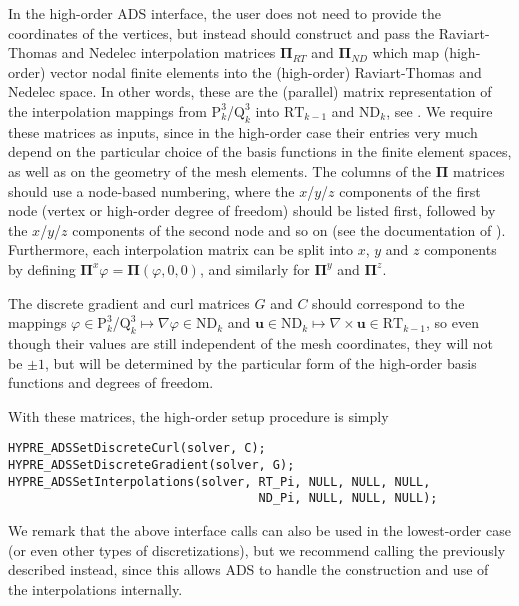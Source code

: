 In the high-order ADS interface, the user does not need to provide the
coordinates of the vertices, but instead should construct and pass the
Raviart-Thomas and Nedelec interpolation matrices ${\mathbf \Pi}_{RT}$ and
${\mathbf \Pi}_{ND}$ which map (high-order) vector nodal finite elements into
the (high-order) Raviart-Thomas and Nedelec space. In other words, these are the
(parallel) matrix representation of the interpolation mappings from
$\mathrm{P}_k^3$/$\mathrm{Q}_k^3$ into $\mathrm{RT}_{k-1}$ and $\mathrm{ND}_k$,
see \cite{xu_H_curl, ams_jcm}.  We require these matrices as inputs, since in
the high-order case their entries very much depend on the particular choice of
the basis functions in the finite element spaces, as well as on the geometry of
the mesh elements. The columns of the ${\mathbf \Pi}$ matrices should use a
node-based numbering, where the $x$/$y$/$z$ components of the first node (vertex
or high-order degree of freedom) should be listed first, followed by the
$x$/$y$/$z$ components of the second node and so on (see the documentation of
). Furthermore, each interpolation matrix can be
split into $x$, $y$ and $z$ components by defining ${\mathbf \Pi}^x \varphi =
{\mathbf \Pi} (\varphi,0,0)$, and similarly for ${\mathbf \Pi}^y$ and ${\mathbf
  \Pi}^z$.

The discrete gradient and curl matrices $G$ and $C$ should correspond to the
mappings $\varphi \in \mathrm{P}_k^3$/$\mathrm{Q}_k^3 \mapsto \nabla \varphi \in
\mathrm{ND}_k$ and ${\mathbf u} \in \mathrm{ND}_k \mapsto \nabla \times {\mathbf
  u} \in \mathrm{RT}_{k-1}$, so even though their values are still independent
of the mesh coordinates, they will not be $\pm 1$, but will be determined by the
particular form of the high-order basis functions and degrees of freedom.

With these matrices, the high-order setup procedure is simply
\begin{display}\begin{verbatim}
HYPRE_ADSSetDiscreteCurl(solver, C);
HYPRE_ADSSetDiscreteGradient(solver, G);
HYPRE_ADSSetInterpolations(solver, RT_Pi, NULL, NULL, NULL,
                                   ND_Pi, NULL, NULL, NULL);
\end{verbatim}\end{display}
We remark that the above interface calls can also be used in the lowest-order
case (or even other types of discretizations), but we recommend calling the
previously described  instead, since this
allows ADS to handle the construction and use of the interpolations internally.


